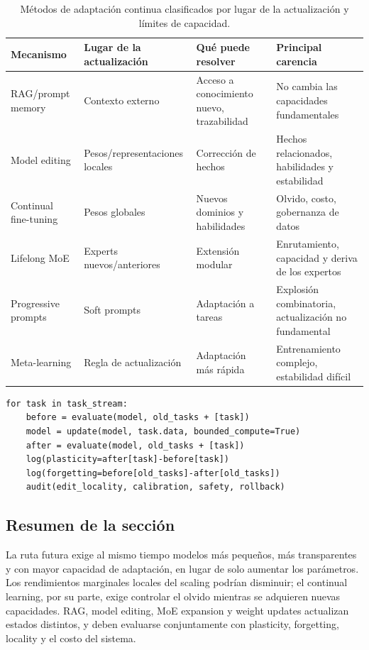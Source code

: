 \documentclass[a4paper]{article}
\begin{document}
\begin{table}[H]
\centering
\small
\begin{tabularx}{\textwidth}{L{0.18\textwidth} L{0.20\textwidth} X X}
\toprule
Mecanismo & Lugar de la actualización & Qué puede resolver & Principal carencia \\
\midrule
RAG/prompt memory & Contexto externo & Acceso a conocimiento nuevo, trazabilidad & No cambia las capacidades fundamentales \\
Model editing & Pesos/representaciones locales & Corrección de hechos & Hechos relacionados, habilidades y estabilidad \\
Continual fine-tuning & Pesos globales & Nuevos dominios y habilidades & Olvido, costo, gobernanza de datos \\
Lifelong MoE & Experts nuevos/anteriores & Extensión modular & Enrutamiento, capacidad y deriva de los expertos \\
Progressive prompts & Soft prompts & Adaptación a tareas & Explosión combinatoria, actualización no fundamental \\
Meta-learning & Regla de actualización & Adaptación más rápida & Entrenamiento complejo, estabilidad difícil \\
\bottomrule
\end{tabularx}
\caption{Métodos de adaptación continua clasificados por lugar de la actualización y límites de capacidad.}
\end{table}

\begin{lstlisting}[caption={Protocolo mínimo de continual-learning evaluation}]
for task in task_stream:
    before = evaluate(model, old_tasks + [task])
    model = update(model, task.data, bounded_compute=True)
    after = evaluate(model, old_tasks + [task])
    log(plasticity=after[task]-before[task])
    log(forgetting=before[old_tasks]-after[old_tasks])
    audit(edit_locality, calibration, safety, rollback)
\end{lstlisting}

\subsection{Resumen de la sección}

La ruta futura exige al mismo tiempo modelos más pequeños, más transparentes y con mayor capacidad de adaptación, en lugar de solo aumentar los parámetros. Los rendimientos marginales locales del scaling podrían disminuir; el continual learning, por su parte, exige controlar el olvido mientras se adquieren nuevas capacidades. RAG, model editing, MoE expansion y weight updates actualizan estados distintos, y deben evaluarse conjuntamente con plasticity, forgetting, locality y el costo del sistema.
\end{document}
